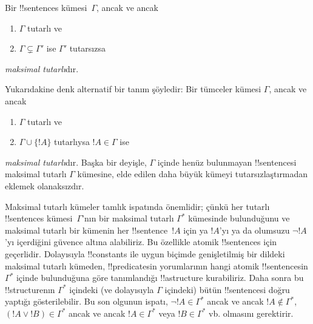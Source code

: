 


\begin{defn}
Bir !!{sentence}s kümesi~$\Gamma$, ancak ve ancak
\begin{enumerate}
\item $\Gamma$ tutarlı ve
\item $\Gamma \subsetneq \Gamma'$ ise $\Gamma'$ tutarsızsa
\end{enumerate}
\emph{maksimal tutarlı}dır.
\end{defn}

\begin{explain}
Yukarıdakine denk alternatif bir tanım şöyledir: Bir tümceler kümesi
$\Gamma$, ancak ve ancak
\begin{enumerate}
\item $\Gamma$ tutarlı ve
\item $\Gamma \cup \{ !A \}$ tutarlıysa $!A \in \Gamma$ ise
\end{enumerate}
\emph{maksimal tutarlı}dır. Başka bir deyişle, $\Gamma$ içinde henüz
bulunmayan !!{sentence}s{}i maksimal tutarlı $\Gamma$ kümesine, elde edilen
daha büyük kümeyi tutarsızlaştırmadan eklemek olanaksızdır.
\end{explain}

\begin{explain}
Maksimal tutarlı kümeler tamlık ispatında önemlidir; çünkü her tutarlı
!!{sentence}s kümesi~$\Gamma$'nın bir maksimal tutarlı $\Gamma^*$ kümesinde
bulunduğunu ve maksimal tutarlı bir kümenin her !!{sentence}~$!A$ için ya
$!A$'yı ya da olumsuzu $\lnot !A$'yı içerdiğini güvence altına alabiliriz.
Bu özellikle atomik !!{sentence}s için geçerlidir. Dolayısıyla !!{constant}s
ile uygun biçimde genişletilmiş bir dildeki maksimal tutarlı kümeden,
!!{predicate}s{}in yorumlarının hangi atomik !!{sentence}s{}in $\Gamma^*$ içinde
bulunduğuna göre tanımlandığı !!a{structure} kurabiliriz. Daha sonra bu
!!{structure}{}nın $\Gamma^*$ içindeki (ve dolayısıyla $\Gamma$ içindeki) bütün
!!{sentence}s{}i doğru yaptığı gösterilebilir. Bu son olgunun ispatı,
$\lnot !A \in \Gamma^*$ ancak ve ancak $!A \notin \Gamma^*$,
$(!A \lor !B) \in \Gamma^*$ ancak ve ancak $!A \in \Gamma^*$ veya
$!B \in \Gamma^*$ vb. olmasını gerektirir.
\end{explain}

